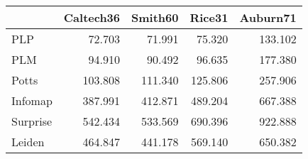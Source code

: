 \begin{tabular}{lrrrr}
\toprule
{} & Caltech36 & Smith60 &  Rice31 & Auburn71 \\
\midrule
PLP      &    72.703 &  71.991 &  75.320 &  133.102 \\
PLM      &    94.910 &  90.492 &  96.635 &  177.380 \\
Potts    &   103.808 & 111.340 & 125.806 &  257.906 \\
Infomap  &   387.991 & 412.871 & 489.204 &  667.388 \\
Surprise &   542.434 & 533.569 & 690.396 &  922.888 \\
Leiden   &   464.847 & 441.178 & 569.140 &  650.382 \\
\bottomrule
\end{tabular}
